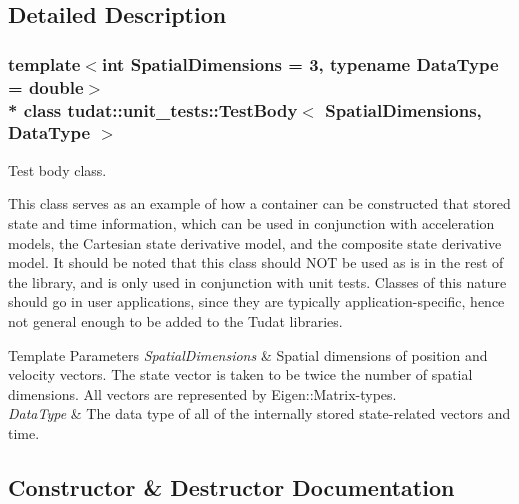\subsection{Detailed Description}
\subsubsection*{template$<$int Spatial\+Dimensions = 3, typename Data\+Type = double$>$\\*
class tudat\+::unit\+\_\+tests\+::\+Test\+Body$<$ Spatial\+Dimensions, Data\+Type $>$}

Test body class. 

This class serves as an example of how a container can be constructed that stored state and time information, which can be used in conjunction with acceleration models, the Cartesian state derivative model, and the composite state derivative model. It should be noted that this class should N\+OT be used as is in the rest of the library, and is only used in conjunction with unit tests. Classes of this nature should go in user applications, since they are typically application-\/specific, hence not general enough to be added to the Tudat libraries. 
\begin{DoxyTemplParams}{Template Parameters}
{\em Spatial\+Dimensions} & Spatial dimensions of position and velocity vectors. The state vector is taken to be twice the number of spatial dimensions. All vectors are represented by Eigen\+::\+Matrix-\/types. \\
\hline
{\em Data\+Type} & The data type of all of the internally stored state-\/related vectors and time. \\
\hline
\end{DoxyTemplParams}


\subsection{Constructor \& Destructor Documentation}
